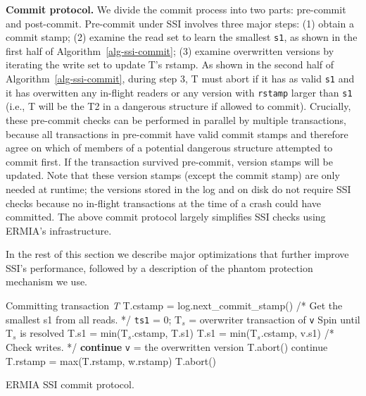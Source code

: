 {\bf Commit protocol.}
We divide the commit process into two parts: pre-commit and post-commit. Pre-commit under SSI involves three major steps: (1) obtain a commit stamp; (2) examine the read set to learn the smallest \texttt{s1}, as shown in the first half of Algorithm~\ref{alg-ssi-commit}; (3) examine overwritten versions by iterating the write set to update T's rstamp. As shown in the second half of Algorithm~\ref{alg-ssi-commit}, during step 3, T must abort if it has as valid \texttt{s1} and it has overwitten any in-flight readers or any version with \texttt{rstamp} larger than \texttt{s1} (i.e., T will be the T2 in a dangerous structure if allowed to commit). Crucially, these pre-commit checks can be performed in parallel by multiple transactions, because all transactions in pre-commit have valid commit stamps and therefore agree on which of members of a potential dangerous structure attempted to commit first. If the transaction survived pre-commit, version stamps will be updated. Note that these version stamps (except the commit stamp) are only needed at runtime; the versions stored in the log and on disk do not require SSI checks because no in-flight transactions at the time of a crash could have committed. The above commit protocol largely simplifies SSI checks using ERMIA's infrastructure.

In the rest of this section we describe major optimizations that further improve SSI's performance, followed by a description of the phantom protection mechanism we use.

\begin{algorithm}
\begin{algorithmic}[1]
 Committing transaction \textit{T}
\STATE T.cstamp = log.next\_commit\_stamp()
\STATE /* Get the smallest s1 from all reads. */
\STATE \texttt{ts1} = 0;
\STATE T$_s$ = overwriter transaction of \texttt{v}
\STATE Spin until T$_s$ is resolved
\STATE T.s1 = min(T$_s$.cstamp, T.s1)
\ENDIF
\ELSE
\STATE T.s1 = min(T$_s$.cstamp, v.s1)
\ENDIF
\ENDFOR
\STATE
\STATE /* Check writes. */
\STATE \textbf{continue}
\ENDIF
\STATE \texttt{v} = the overwritten version
\STATE T.abort()
\ENDIF
{}
\STATE continue
\ENDIF
\STATE T.rstamp = max(T.rstamp, w.rstamp)
\STATE T.abort()
\ENDIF
\ENDFOR
\ENDFOR
\end{algorithmic}
\label{alg-ssi-commit}
\caption{ERMIA SSI commit protocol.}
\end{algorithm}

